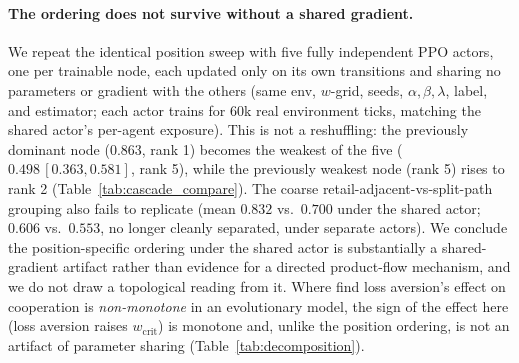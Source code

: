 \documentclass[letterpaper]{article} %
\theoremstyle{plain}
\newcommand{\wcrit}{w_{\mathrm{crit}}}
\begin{document}
\paragraph{The ordering does not survive without a shared gradient.}
We repeat the identical position sweep with five fully independent PPO actors, one per trainable node,
each updated only on its own transitions and sharing no parameters or gradient with the others (same
env, $w$-grid, seeds, $\alpha,\beta,\lambda$, label, and estimator; each actor trains for $60$k real
environment ticks, matching the shared actor's per-agent exposure). This is not a reshuffling: the
previously dominant node ($0.863$, rank 1)
becomes the weakest of the five ($0.498\,[0.363,0.581]$, rank 5), while the previously weakest node
(rank 5) rises to rank 2 (Table~\ref{tab:cascade_compare}). The coarse retail-adjacent-vs-split-path
grouping also fails to replicate (mean $0.832$ vs.\ $0.700$ under the shared actor; $0.606$ vs.\ $0.553$,
no longer cleanly separated, under separate actors). We conclude the position-specific ordering under
the shared actor is substantially a shared-gradient artifact rather than evidence for a directed
product-flow mechanism, and we do not draw a topological reading from it. Where \citet{mengesha2025}
find loss aversion's effect on cooperation is \emph{non-monotone} in an evolutionary model, the sign of
the effect here (loss aversion raises $\wcrit$) is monotone and, unlike the position ordering, is not
an artifact of parameter sharing (Table~\ref{tab:decomposition}).
\end{document}
